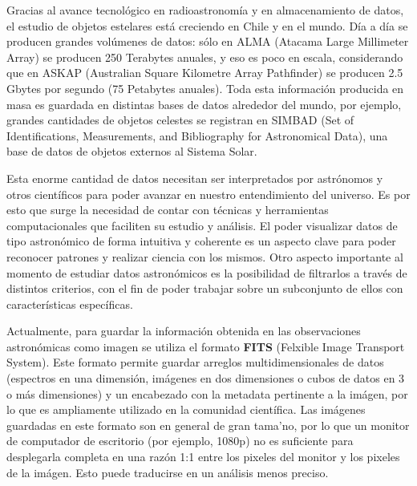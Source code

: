 \begin{intro}
Gracias al avance tecnol\'ogico en radioastronom\'ia y en almacenamiento de datos, el estudio de objetos estelares est\'a creciendo en Chile y en el mundo. D\'ia a d\'ia se producen grandes vol\'umenes de datos: s\'olo en ALMA (Atacama Large Millimeter Array) se producen 250 Terabytes anuales, y eso es poco en escala, considerando que en ASKAP (Australian Square Kilometre Array Pathfinder) se producen 2.5 Gbytes por segundo (75 Petabytes anuales). Toda esta informaci\'on producida en masa es guardada en distintas bases de datos alrededor del mundo, por ejemplo, grandes cantidades de objetos celestes se registran en SIMBAD (Set of Identifications, Measurements, and Bibliography for Astronomical Data), una base de datos de objetos externos al Sistema Solar. 

Esta enorme cantidad de datos necesitan ser interpretados por astr\'onomos y otros cient\'ificos para poder avanzar en nuestro entendimiento del universo. Es por esto que surge la necesidad de contar con t\'ecnicas y herramientas computacionales que faciliten su estudio y an\'alisis. El poder visualizar datos de tipo astron\'omico de forma intuitiva y coherente es un aspecto clave para poder reconocer patrones y realizar ciencia con los mismos. Otro aspecto importante al momento de estudiar datos astron\'omicos es la posibilidad de filtrarlos a trav\'es de distintos criterios, con el fin de poder trabajar sobre un subconjunto de ellos con caracter\'isticas espec\'ificas.

Actualmente, para guardar la informaci\'on obtenida en las observaciones astron\'omicas como imagen se utiliza el formato \textbf{FITS} (Felxible Image Transport System). Este formato permite guardar arreglos multidimensionales de datos (espectros en una dimensi\'on, im\'agenes en dos dimensiones o cubos de datos en 3 o m\'as dimensiones) y un encabezado con la metadata pertinente a la im\'agen, por lo que es ampliamente utilizado en la comunidad cient\'ifica. Las im\'agenes guardadas en este formato son en general de gran tama'no, por lo que un monitor de computador de escritorio (por ejemplo, 1080p) no es suficiente para desplegarla completa en una raz\'on 1:1 entre los pixeles del monitor y los pixeles de la im\'agen. Esto puede traducirse en un an\'alisis menos preciso.



\end{intro}
